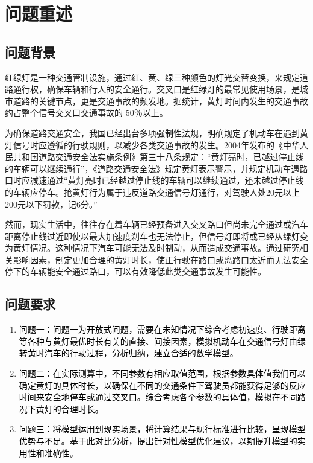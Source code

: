 \documentclass[withoutpreface,bwprint]{cumcmthesis}
\begin{document}
\tableofcontents  %
\newpage

\section{问题重述}
\subsection{问题背景}
红绿灯是一种交通管制设施，通过红、黄、绿三种颜色的灯光交替变换，来规定道路通行权，确保车辆和行人的安全通行。交叉口是红绿灯的最常见使用场景，是城市道路的关键节点，更是交通事故的频发地。据统计，黄灯时间内发生的交通事故约占整个信号交叉口交通事故的 50％以上。

为确保道路交通安全，我国已经出台多项强制性法规，明确规定了机动车在遇到黄灯信号时应遵循的行驶规则，以减少各类交通事故的发生。2004年发布的《中华人民共和国道路交通安全法实施条例》第三十八条规定：“黄灯亮时，已越过停止线的车辆可以继续通行”，《道路交通安全法》规定黄灯表示警示，并规定机动车遇路口时应减速通过“黄灯亮时已经越过停止线的车辆可以继续通过，还未越过停止线的车辆应停车。抢黄灯行为属于违反道路交通信号灯通行，对驾驶人处20元以上200元以下罚款，记6分。”

然而，现实生活中，往往存在着车辆已经预备进入交叉路口但尚未完全通过或汽车距离停止线过近即使以最大加速度刹车也无法停止，但信号灯即将或已经从绿灯变为黄灯情况。这种情况下汽车可能无法及时制动，从而造成交通事故。通过研究相关影响因素，制定更加合理的黄灯时长，使正行驶在路口或离路口太近而无法安全停下的车辆能安全通过路口，可以有效降低此类交通事故发生可能性。


\begin{tikzpicture}[
	thick_arrow/.style={
		postaction={
			-Stealth, %
			draw,      %
			thick      %
		}
	}
	]
	

\end{tikzpicture}
\subsection{问题要求}
\begin{enumerate}
  \item \textcolor{black}{问题一：问题一为开放式问题，需要在未知情况下综合考虑初速度、行驶距离等各种与黄灯最优时长有关的直接、间接因素，模拟机动车在交通信号灯由绿转黄时汽车的行驶过程，分析归纳，建立合适的数学模型。}
  \item \textcolor{black}{问题二：在实际测算中，不同参数有相应取值范围，根据参数具体值我们可以确定黄灯的具体时长，以确保在不同的交通条件下驾驶员都能获得足够的反应时间来安全地停车或通过交叉口。综合考虑各个参数的具体值，模拟在不同路况下黄灯的合理时长。}
  \item \textcolor{black}{问题三：将模型运用到现实场景，将计算结果与现行标准进行比较，呈现模型优势与不足。基于此对比分析，提出针对性模型优化建议，以期提升模型的实用性和准确性。}
\end{enumerate}
\end{document}
